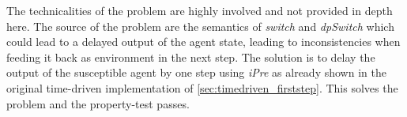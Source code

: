 The technicalities of the problem are highly involved and not provided in depth here. The source of the problem are the semantics of \textit{switch} and \textit{dpSwitch} which could lead to a delayed output of the agent state, leading to inconsistencies when feeding it back as environment in the next step. The solution is to delay the output of the susceptible agent by one step using \textit{iPre} as already shown in the original time-driven implementation of \ref{sec:timedriven_firststep}. This solves the problem and the property-test passes. 

%
%
%
